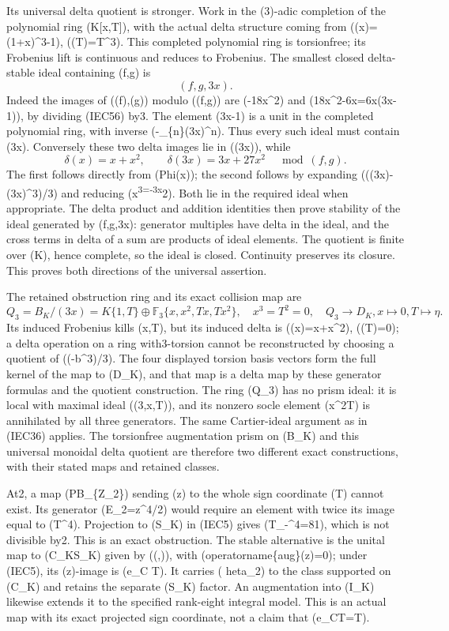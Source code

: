 \documentclass[
]{article}
\begin{document}
Its universal delta quotient is stronger. Work in the (3)-adic
completion of the polynomial ring (K{[}x,T{]}), with the actual delta
structure coming from (\Phi(x)=(1+x)\^{}3-1), (\Phi(T)=T\^{}3). This
completed polynomial ring is torsionfree; its Frobenius lift is
continuous and reduces to Frobenius. The smallest closed delta-stable
ideal containing (f,g) is \[
(f,g,3x).
\tag{IEC57}
\] Indeed the images of (\delta(f),\delta(g)) modulo ((f,g)) are
(-18x\^{}2) and (18x\^{}2-6x=6x(3x-1)), by dividing (IEC56) by3. The
element (3x-1) is a unit in the completed polynomial ring, with inverse
(-\sum\_\{n\}(3x)\^{}n). Thus every such ideal must contain (3x).
Conversely these two delta images lie in ((3x)), while \[
\delta(x)=x+x^2,\qquad
\delta(3x)=3x+27x^2\quad\bmod(f,g).
\tag{IEC58}
\] The first follows directly from (Phi(x)); the second follows by
expanding ((\Phi(3x)-(3x)\^{}3)/3) and reducing
(x\textsuperscript{3=-3x}2). Both lie in the required ideal when
appropriate. The delta product and addition identities then prove
stability of the ideal generated by (f,g,3x): generator multiples have
delta in the ideal, and the cross terms in delta of a sum are products
of ideal elements. The quotient is finite over (K), hence complete, so
the ideal is closed. Continuity preserves its closure. This proves both
directions of the universal assertion.

The retained obstruction ring and its exact collision map are \[
Q_3=B_K/(3x)
=K\{1,T\}\oplus\mathbb F_3\{x,x^2,Tx,Tx^2\},
\quad x^3=T^2=0,
\quad Q_3\longrightarrow D_K, x\mapsto0, T\mapsto\eta.
\tag{IEC59}
\] Its induced Frobenius kills (x,T), but its induced delta is
(\delta(x)=x+x\^{}2), (\delta(T)=0); a delta operation on a ring
with3-torsion cannot be reconstructed by choosing a quotient of
((\Phi-b\^{}3)/3). The four displayed torsion basis vectors form the
full kernel of the map to (D\_K), and that map is a delta map by these
generator formulas and the quotient construction. The ring (Q\_3) has no
prism ideal: it is local with maximal ideal ((3,x,T)), and its nonzero
socle element (x\^{}2T) is annihilated by all three generators. The same
Cartier-ideal argument as in (IEC36) applies. The torsionfree
augmentation prism on (B\_K) and this universal monoidal delta quotient
are therefore two different exact constructions, with their stated maps
and retained classes.

At2, a map (\widehat P\to B\_\{\mathbb Z\_2\}) sending (z) to the whole
sign coordinate (T) cannot exist. Its generator (E\_2=z\^{}4/2) would
require an element with twice its image equal to (T\^{}4). Projection to
(S\_K) in (IEC5) gives (T\_-\^{}4=81), which is not divisible by2. This
is an exact obstruction. The stable alternative is the unital map to
(C\_K\times S\_K) given by ((\rho,)), with
(operatorname\{aug\}(z)=0); under (IEC5), its (z)-image is (e\_C T). It
carries ( heta\_2) to the class supported on (C\_K) and retains the
separate (S\_K) factor. An augmentation into (I\_K) likewise extends it
to the specified rank-eight integral model. This is an actual map with
its exact projected sign coordinate, not a claim that (e\_CT=T).
\end{document}
